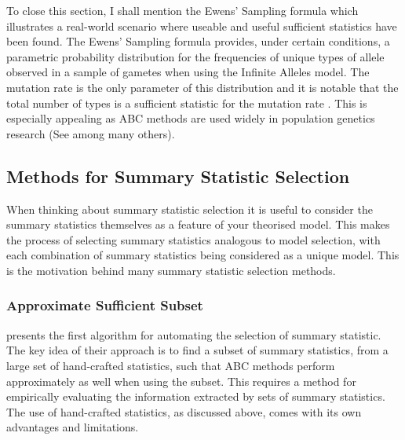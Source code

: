 \documentclass[bibliography=totoc,11pt,a4paper,margin=0]{article}
\theoremstyle{break}
\begin{document}
  \par To close this section, I shall mention the Ewens' Sampling formula \cite{ewens_sampling_formula} which illustrates a real-world scenario where useable and useful sufficient statistics have been found. The Ewens' Sampling formula provides, under certain conditions, a parametric probability distribution for the frequencies of unique types of allele observed in a sample of gametes when using the Infinite Alleles model. The mutation rate is the only parameter of this distribution and it is notable that the total number of types is a sufficient statistic for the mutation rate \cite[]{partition_structures_and_sufficient_statistics}. This is especially appealing as ABC methods are used widely in population genetics research (See \cite[]{bayesian_inference_of_the_demographic_history_of_chimpanzees,ABC_in_population_genetics,modern_computational_approaches_for_analysing_molecular_genetic_variation_data} among many others).

\subsection{Methods for Summary Statistic Selection}\label{sec_summary_stats_methods}

  \par When thinking about summary statistic selection it is useful to consider the summary statistics themselves as a feature of your theorised model. This makes the process of selecting summary statistics analogous to model selection, with each combination of summary statistics being considered as a unique model. This is the motivation behind many summary statistic selection methods.


\subsubsection{Approximate Sufficient Subset}\label{sec_approximate_sufficient_subset}

  \par \cite[]{Approximately_sufficient_statistics_and_bayesian_computation} presents the first algorithm for automating the selection of summary statistic. The key idea of their approach is to find a subset of summary statistics, from a large set of hand-crafted statistics, such that ABC methods perform approximately as well when using the subset. This requires a method for empirically evaluating the information extracted by sets of summary statistics. The use of hand-crafted statistics, as discussed above, comes with its own advantages and limitations.
\end{document}
